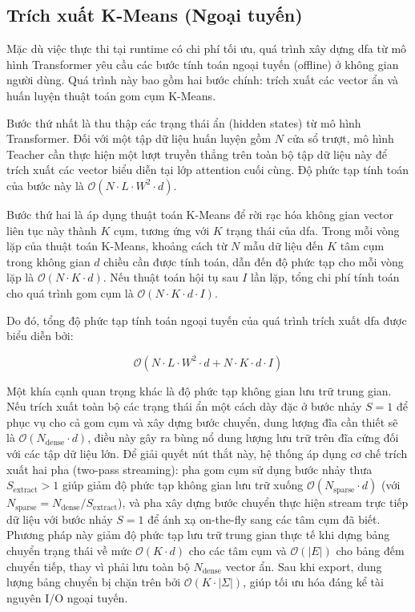 \documentclass[../main.tex]{subfiles}
\begin{document}
\subsection{Trích xuất K-Means (Ngoại tuyến)}
\label{subsec:kmeans_extraction_complexity}

Mặc dù việc thực thi tại runtime có chi phí tối ưu, quá trình xây
dựng \gls{dfa} từ mô hình Transformer yêu cầu các bước tính toán ngoại
tuyến (offline) ở không gian người dùng. Quá trình này bao gồm hai
bước chính: trích xuất các vector ẩn và huấn luyện thuật toán gom cụm K-Means.

Bước thứ nhất là thu thập các trạng thái ẩn (hidden states) từ mô
hình Transformer. Đối với một tập dữ liệu huấn luyện gồm $N$ cửa sổ
trượt, mô hình Teacher cần thực hiện một lượt truyền thẳng trên toàn
bộ tập dữ liệu này để trích xuất các vector biểu diễn tại lớp
attention cuối cùng. Độ phức tạp tính toán của bước này là
$\mathcal{O}(N \cdot L \cdot W^2 \cdot d)$.

Bước thứ hai là áp dụng thuật toán K-Means để rời rạc hóa không gian
vector liên tục này thành $K$ cụm, tương ứng với $K$ trạng thái của
\gls{dfa}. Trong mỗi vòng lặp của thuật toán K-Means, khoảng cách từ $N$
mẫu dữ liệu đến $K$ tâm cụm trong không gian $d$ chiều cần được tính
toán, dẫn đến độ phức tạp cho mỗi vòng lặp là $\mathcal{O}(N \cdot K
\cdot d)$. Nếu thuật toán hội tụ sau $I$ lần lặp, tổng chi phí tính
toán cho quá trình gom cụm là $\mathcal{O}(N \cdot K \cdot d \cdot I)$.

Do đó, tổng độ phức tạp tính toán ngoại tuyến của quá trình trích
xuất \gls{dfa} được biểu diễn bởi:

\begin{equation}
  \label{eq:offline_extraction_complexity}
  \mathcal{O}\left(N \cdot L \cdot W^2 \cdot d + N \cdot K \cdot d
  \cdot I\right)
\end{equation}

Một khía cạnh quan trọng khác là độ phức tạp không gian lưu trữ trung
gian. Nếu trích xuất toàn bộ các trạng thái ẩn một cách dày đặc ở
bước nhảy $S = 1$ để phục vụ cho cả gom cụm và xây dựng bước chuyển,
dung lượng đĩa cần thiết sẽ là $\mathcal{O}(N_{\text{dense}} \cdot
d)$, điều này gây ra bùng nổ dung lượng lưu trữ trên đĩa cứng đối với
các tập dữ liệu lớn. Để giải quyết nút thắt này, hệ thống áp dụng cơ
chế trích xuất hai pha (two-pass streaming): pha gom cụm sử dụng bước
nhảy thưa $S_{\text{extract}} > 1$ giúp giảm độ phức tạp không gian
lưu trữ xuống $\mathcal{O}(N_{\text{sparse}} \cdot d)$ (với
$N_{\text{sparse}} = N_{\text{dense}} / S_{\text{extract}}$), và pha
xây dựng bước chuyển thực hiện stream trực tiếp dữ liệu với bước nhảy
$S=1$ để ánh xạ on-the-fly sang các tâm cụm đã biết. Phương pháp này
giảm độ phức tạp lưu trữ trung gian thực tế khi dựng bảng chuyển
trạng thái về mức $\mathcal{O}(K \cdot d)$ cho các tâm cụm và
$\mathcal{O}(|E|)$ cho bảng đếm chuyển tiếp, thay vì phải lưu toàn bộ
$N_{\text{dense}}$ vector ẩn. Sau khi export, dung lượng bảng chuyển
bị chặn trên bởi $\mathcal{O}(K \cdot |\Sigma|)$, giúp tối ưu hóa
đáng kể tài nguyên I/O ngoại tuyến.
\end{document}
